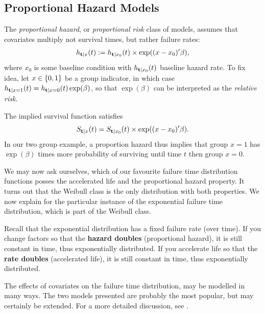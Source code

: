 \subsection{Proportional Hazard Models}
The \emph{proportional hazard}, or \emph{proportional risk} class of models, assumes that covariates multiply not survival times, but rather failure rates: 
\begin{align}
	h_{\mathbf{t}|x} (t):=h_{\mathbf{t}|x_0} (t) \times \exp((x-x_0)'\beta) ,
\end{align}
where $x_0$ is some baseline condition with $h_{\mathbf{t}|x_0} (t)$ baseline hazard rate.
To fix idea, let $x \in \{ 0,1 \}$ be a group indicator, in which case $h_{\mathbf{t}|x=1} (t) = h_{\mathbf{t}|x=0} (t) \exp(\beta)$, so that $\exp(\beta)$ can be interpreted as the \emph{relative risk}.

The implied survival function satisfies $$ S_{\mathbf{t}|x} (t)=S_{\mathbf{t}|x_0} (t) \times \exp((x-x_0)'\beta).$$
In our two group example, a proportion hazard thus implies that group $x=1$ has $\exp(\beta)$ times more probability of surviving until time $t$ then group $x=0$. 


We may now ask ourselves, which of our favourite failure time distribution functions posses the accelerated life and the proportional hazard property. It turns out that the Weibull class is the only distribution with both properties.
We now explain for the particular instance of the exponential failure time distribution, which is part of the Weibull class.
\begin{example}
Recall that the exponential distribution has a fixed failure rate (over time). 
If you change factors so that the \textbf{hazard doubles} (proportional hazard), it is still constant in time, thus exponentially distributed. 
If you accelerate life so that the \textbf{rate doubles} (accelerated life), it is still constant in time, thus exponentially distributed. 
\end{example}


\begin{extra}
The effects of covariates on the failure time distribution, may be modelled in many ways. 
The two models presented are probably the most popular, but may certainly be extended. 
For a more detailed discussion, see \cite{cox_analysis_1984}.
\end{extra}



